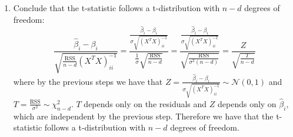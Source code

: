 \begin{enumerate}[label=Step \arabic*., align=left]
          Thus by Lemma~\ref{lem:multinormal} we have that the joint distribution of $\hat{\varepsilon}$ and $\hat{\beta} - \beta$ is multivariate normal. Therefore by Lemma~\ref{lem:multivariate independence} it suffices to show that they are uncorrelated, i.e. $\cov(\hat{\varepsilon}, \hat{\beta} - \beta) = 0$. We have that:          
          \begin{align*}                
              \cov (\hat{\varepsilon}, \hat{\beta} - \beta)
              \overset{*}{=} \E [\hat{\varepsilon} (\hat{\beta} - \beta)^T]
               & = \E [(I - H) \varepsilon \varepsilon^T X (X^TX)^{-1}]
              \\ &\overset{**}{=} (I - H) \E [\varepsilon \varepsilon^T] X (X^TX)^{-1}
              \\ &= \sigma^2 (I - H) X (X^TX)^{-1}
          \end{align*}
          where $*$ follows from the fact that both $\hat{\varepsilon}$ and $\hat{\beta} - \beta$ have expected value of zero as the linear transformation of $\varepsilon$ which has expected value of zero. $**$ follows from \ref{prop:expectation linearity}.
          
          By Lemma~\ref{prop:kernel image} we have that $\im(X) = \ker(I - H)$, thus $(I - H) X = 0$, hence:
          \[\cov (\hat{\varepsilon}, \hat{\beta} - \beta)
              = \sigma^2 (I - H) X (X^TX)^{-1}
              = 0\]
    \item Conclude that the t-statistic follows a t-distribution with $n - d$ degrees of freedom:
          \[\frac{\hat{\beta}_i - \beta_i}{\sqrt{\frac{\text{RSS}}{n - d} (X^TX)^{-1}_{ii}}}
              = \frac{\frac{\hat{\beta}_i - \beta_i}{\sigma \sqrt{(X^TX)^{-1}_{ii}}}}{\frac{1}{\sigma} \sqrt{\frac{\text{RSS}}{n - d}}}
              = \frac{\frac{\hat{\beta}_i - \beta_i}{\sigma \sqrt{(X^TX)^{-1}_{ii}}}}{\sqrt{\frac{\text{RSS}}{\sigma^2 (n - d)}}}
              = \frac{Z}{\sqrt{\frac{T}{n - d}}}\]
          where by the previous steps we have that $Z = \frac{\hat{\beta}_i - \beta_i}{\sigma \sqrt{(X^TX)^{-1}_{ii}}} \sim \mathcal{N}(0, 1)$ and $T = \frac{\text{RSS}}{\sigma^2} \sim \chi^2_{n - d}$. $T$ depends only on the residuals and $Z$ depends only on $\hat{\beta}_i$, which are independent by the previous step. Therefore we have that the t-statistic follows a t-distribution with $n - d$ degrees of freedom.
\end{enumerate}


